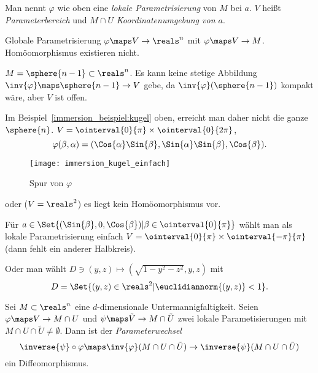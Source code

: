 \begin{bemerkungen*}
  \item Man nennt \( \varphi \) wie oben eine \emph{lokale Parametrisierung} von \( M \) bei \( a \). \( V \) heißt \emph{Parameterbereich} und \( M\cap U \) \emph{Koordinatenumgebung von \( a \)}.
  \item Globale Parametrisierung \( \varphi\maps V\to\reals^n \) mit \( \varphi\maps V\to M \). Homöomorphismus existieren \ia nicht.
  \begin{beispiel*}
    \( M=\sphere{n-1}\subset \reals^n \). Es kann keine stetige Abbildung \( \inv{\varphi}\maps \sphere{n-1}\to V \) gebe, da \( \inv{\varphi}(\sphere{n-1}) \) kompakt wäre, aber \( V \) ist offen.
    
    Im Beispiel~\ref{immersion_beispiel:kugel} oben, erreicht man daher nicht die ganze \( \sphere{n} \). \( V=\ointerval{0}{\pi}\times \ointerval{0}{2\pi} \),
    \begin{equation*}
      \varphi(\beta,\alpha)=(\Cos{\alpha}\Sin{\beta},\Sin{\alpha}\Sin{\beta},\Cos{\beta}).
    \end{equation*}
    \begin{figure}[H]
      \centering
      \texttt{[image: immersion\_kugel\_einfach]}
      \caption*{Spur von \( \varphi \)}
      \label{fig:immersion_kugel_einfach}
    \end{figure}
    oder (\( V=\reals^2 \)) es liegt kein Homöomorphismus vor.

    Für \( a\in \Set{(\Sin{\beta},0,\Cos{\beta})|\beta\in \ointerval{0}{\pi}} \) wählt man als lokale Parametrisierung einfach \( V=\ointerval{0}{\pi}\times \ointerval{-\pi}{\pi} \) (dann fehlt ein anderer Halbkreis).

    Oder man wählt \( D\ni (y,z)\mapsto (\sqrt{1-y^2-z^2},y,z) \) mit
    \begin{equation*}
      D=\Set{(y,z)\in \reals^2|\euclidiannorm{(y,z)}<1}.
    \end{equation*}
  \end{beispiel*}
\end{bemerkungen*}
\begin{satz}[Parameterwechsel]\label{parameterwechsel}
  Sei \( M\subset \reals^n \) eine \( d \)-dimensionale Untermannigfaltigkeit. Seien \( \varphi\maps V\to M\cap U \) und \( \psi\maps \tilde{V}\to M\cap \tilde{U} \) zwei lokale Parametisierungen mit \( M\cap U\cap \tilde{U}\neq \emptyset \). Dann ist der \emph{Parameterwechsel}   
  \begin{equation*}
    \inverse{\psi}\circ \varphi\maps \inv{\varphi}(M\cap U\cap \tilde{U})\to \inverse{\psi}(M\cap U\cap \tilde{U})
  \end{equation*}
  ein Diffeomorphismus.
\end{satz}
